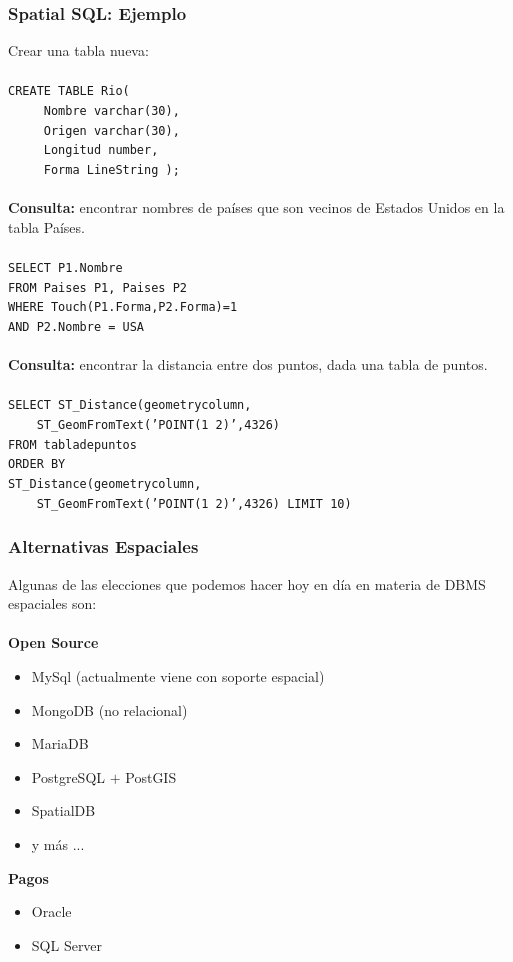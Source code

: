 \documentclass[a4paper,12pt,oneside]{report}
\begin{document}
\subsubsection*{Spatial SQL: Ejemplo}
Crear una tabla nueva:\\
\ \\
\texttt{CREATE TABLE Rio(\\
\ \ \ \ \ Nombre varchar(30),\\
\ \ \ \ \ Origen varchar(30),\\
\ \ \ \ \ Longitud number,\\
\ \ \ \ \ Forma LineString );}\\
\ \\
\textbf{Consulta:} encontrar nombres de pa\'ises que son vecinos de Estados Unidos en la tabla Pa\'ises.\\
\ \\
\texttt{SELECT P1.Nombre\\
FROM Paises P1, Paises P2\\
WHERE Touch(P1.Forma,P2.Forma)=1\\
AND P2.Nombre = USA}\\
\ \\
\textbf{Consulta:} encontrar la distancia entre dos puntos, dada una tabla de puntos.\\
\ \\
\texttt{SELECT ST\_Distance(geometrycolumn,\\
\ \ \ \ ST\_GeomFromText('POINT(1 2)',4326)\\
FROM tabladepuntos\\
ORDER BY\\
ST\_Distance(geometrycolumn,\\
\ \ \ \ ST\_GeomFromText('POINT(1 2)',4326) LIMIT 10)}
\subsubsection*{Alternativas Espaciales}
Algunas de las elecciones que podemos hacer hoy en d\'ia en materia de DBMS espaciales son:\\
\ \\
\textbf{Open Source}
\begin{itemize}
\item MySql (actualmente viene con soporte espacial)
\item MongoDB (no relacional)
\item MariaDB
\item PostgreSQL $+$ PostGIS
\item SpatialDB
\item y m\'as ...
\end{itemize}
\textbf{Pagos}
\begin{itemize}
\item Oracle
\item SQL Server
\end{itemize}
\end{document}
